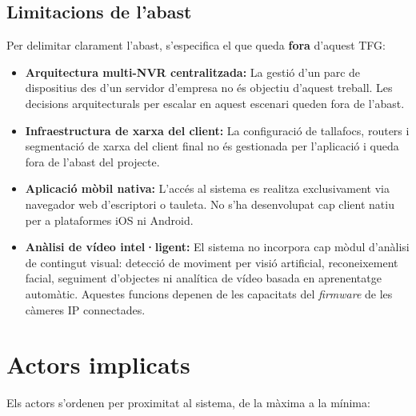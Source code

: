 \subsection{Limitacions de l'abast}
Per delimitar clarament l'abast, s'especifica el que queda \textbf{fora} d'aquest TFG:

\begin{itemize}
  \item \textbf{Arquitectura multi-NVR centralitzada:} La gestió d'un parc de dispositius des d'un servidor d'empresa no és objectiu d'aquest treball. Les decisions arquitecturals per escalar en aquest escenari queden fora de l'abast.
  \item \textbf{Infraestructura de xarxa del client:} La configuració de tallafocs, routers i segmentació de xarxa del client final no és gestionada per l'aplicació i queda fora de l'abast del projecte.
  \item \textbf{Aplicació mòbil nativa:} L'accés al sistema es realitza exclusivament via navegador web d'escriptori o tauleta. No s'ha desenvolupat cap client natiu per a plataformes iOS ni Android.
  \item \textbf{Anàlisi de vídeo intel·ligent:} El sistema no incorpora cap mòdul d'anàlisi de contingut visual: detecció de moviment per visió artificial, reconeixement facial, seguiment d'objectes ni analítica de vídeo basada en aprenentatge automàtic. Aquestes funcions depenen de les capacitats del \textit{firmware} de les càmeres IP connectades.
\end{itemize}

\section{Actors implicats}
Els actors s'ordenen per proximitat al sistema, de la màxima a la mínima:

